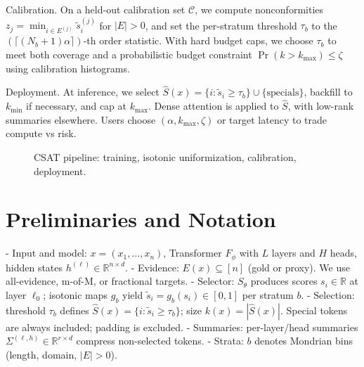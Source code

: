 \documentclass[11pt]{article}
\begin{document}
Calibration. On a held-out calibration set $\mathcal{C}$, we compute nonconformities $z_j=\min_{i\in E^{(j)}} \tilde{s}^{(j)}_i$ for $|E|>0$, and set the per-stratum threshold $\tau_b$ to the $(\lceil (N_b+1)\alpha\rceil)$-th order statistic. With hard budget caps, we choose $\tau_b$ to meet both coverage and a probabilistic budget constraint $\Pr(k>k_{\max})\le \zeta$ using calibration histograms.

Deployment. At inference, we select $\hat{S}(x)=\{i:\tilde{s}_i\ge\tau_b\}\cup\{\text{specials}\}$, backfill to $k_{\min}$ if necessary, and cap at $k_{\max}$. Dense attention is applied to $\hat{S}$, with low-rank summaries elsewhere. Users choose $(\alpha,k_{\max},\zeta)$ or target latency to trade compute vs risk.

\begin{figure}[t]
\centering
{}
\caption{CSAT pipeline: training, isotonic uniformization, calibration, deployment.}
\end{figure}

\section{Preliminaries and Notation}
- Input and model: $x=(x_1,\dots,x_n)$, Transformer $F_\phi$ with $L$ layers and $H$ heads, hidden states $h^{(\ell)}\in\mathbb{R}^{n\times d}$.
- Evidence: $E(x)\subseteq[n]$ (gold or proxy). We use all-evidence, m-of-M, or fractional targets.
- Selector: $S_\theta$ produces scores $s_i\in\mathbb{R}$ at layer $\ell_0$; isotonic maps $g_b$ yield $\tilde{s}_i=g_b(s_i)\in[0,1]$ per stratum $b$.
- Selection: threshold $\tau_b$ defines $\hat{S}(x)=\{i:\tilde{s}_i\ge\tau_b\}$; size $k(x)=|\hat{S}(x)|$. Special tokens are always included; padding is excluded.
- Summaries: per-layer/head summaries $\Sigma^{(\ell,h)}\in\mathbb{R}^{r\times d}$ compress non-selected tokens.
- Strata: $b$ denotes Mondrian bins (length, domain, $|E|>0$).
\end{document}
